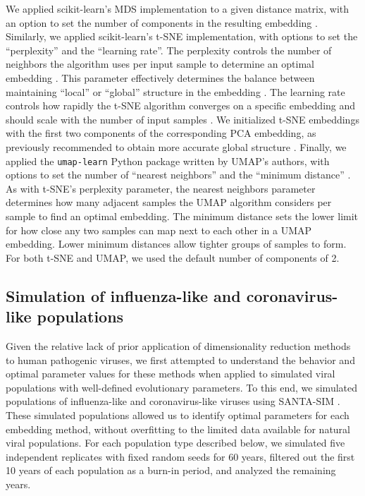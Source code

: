 \documentclass[webpdf,contemporary,large,single]{oup-authoring-template}%
\theoremstyle{thmstyleone}%
\theoremstyle{thmstyletwo}%
\theoremstyle{thmstylethree}%
\begin{document}
We applied scikit-learn's MDS implementation to a given distance matrix, with an option to set the number of components in the resulting embedding \citep{Pedregosa2011}.
Similarly, we applied scikit-learn's t-SNE implementation, with options to set the ``perplexity'' and the ``learning rate''.
The perplexity controls the number of neighbors the algorithm uses per input sample to determine an optimal embedding \citep{maaten2008visualizing}.
This parameter effectively determines the balance between maintaining ``local'' or ``global'' structure in the embedding \citep{kobak_2019}.
The learning rate controls how rapidly the t-SNE algorithm converges on a specific embedding \citep{Jacobs1988,maaten2008visualizing} and should scale with the number of input samples \citep{Belkina2019}.
We initialized t-SNE embeddings with the first two components of the corresponding PCA embedding, as previously recommended to obtain more accurate global structure \citep{kobak_2019,kobak_2021}.
Finally, we applied the \texttt{umap-learn} Python package written by UMAP's authors, with options to set the number of ``nearest neighbors'' and the ``minimum distance'' \citep{lel2018umap}.
As with t-SNE's perplexity parameter, the nearest neighbors parameter determines how many adjacent samples the UMAP algorithm considers per sample to find an optimal embedding.
The minimum distance sets the lower limit for how close any two samples can map next to each other in a UMAP embedding.
Lower minimum distances allow tighter groups of samples to form.
For both t-SNE and UMAP, we used the default number of components of 2.

\subsection{Simulation of influenza-like and coronavirus-like populations}

Given the relative lack of prior application of dimensionality reduction methods to human pathogenic viruses, we first attempted to understand the behavior and optimal parameter values for these methods when applied to simulated viral populations with well-defined evolutionary parameters.
To this end, we simulated populations of influenza-like and coronavirus-like viruses using SANTA-SIM \citep{Jariani2019}.
These simulated populations allowed us to identify optimal parameters for each embedding method, without overfitting to the limited data available for natural viral populations.
For each population type described below, we simulated five independent replicates with fixed random seeds for 60 years, filtered out the first 10 years of each population as a burn-in period, and analyzed the remaining years.
\end{document}
